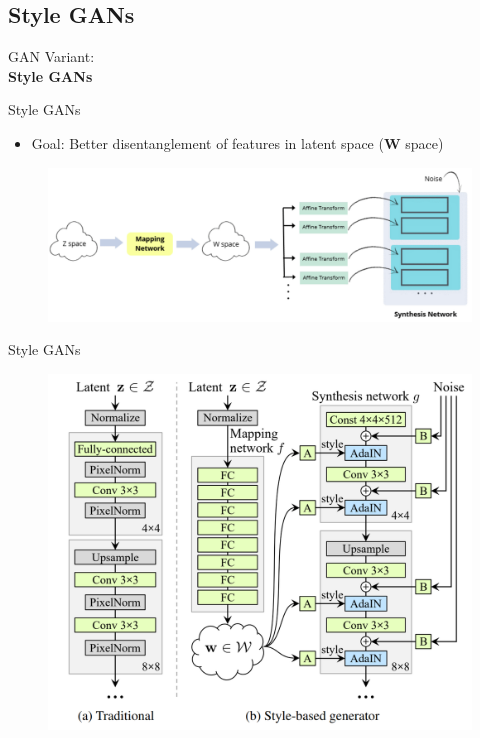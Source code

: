 \subsection{Style GANs}
\begin{frame}{}
    \LARGE GAN Variant: \\[1.5ex] \textbf{Style GANs}
\end{frame}

\begin{frame}[allowframebreaks]{Style GANs}
\begin{itemize}
    \item Goal: Better disentanglement of features in latent space (\textbf{W} space)
\end{itemize}
    \begin{figure}
    \centering
    \includegraphics[height=0.9\textheight, width=\textwidth, keepaspectratio]{images/gan/stylegan_2.png}
\end{figure}

\end{frame}
\begin{frame}[allowframebreaks]{Style GANs}
\begin{figure}
    \centering
    \includegraphics[height=0.9\textheight, width=\textwidth, keepaspectratio]{images/gan/stylegan_1.png}
\end{figure}
\end{frame}
